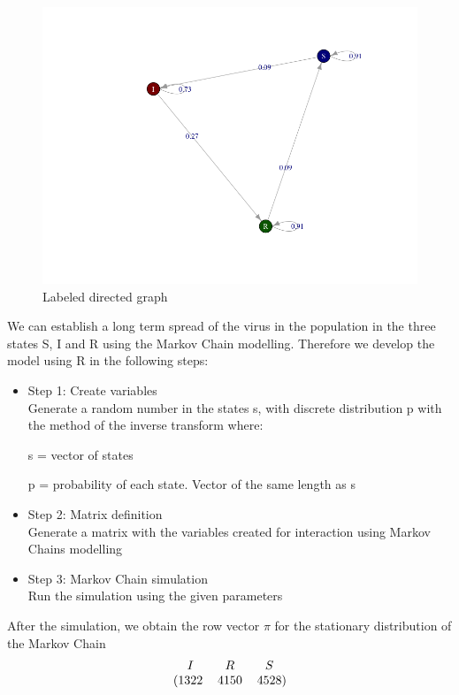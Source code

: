 \documentclass[10pt]{article}
\theoremstyle{plain}
\theoremstyle{definition}
\begin{document}
\begin{figure}[H]
    \centering
    \includegraphics[scale=0.5]{figures/MCPlot.png}
    \caption{Labeled directed graph}
    \label{fig:my_label1}
\end{figure}
We can establish a long term spread of the virus in the population in the three states S, I and R using the Markov Chain modelling. Therefore we develop the model using R in the following steps: 
\begin{itemize}
    \item Step 1: Create variables\\
    Generate a random number in the states s, with discrete distribution p with the method of the inverse transform where: 

s = vector of states 

p = probability of each state. Vector of the same length as s 

    \item Step 2: Matrix definition \\
    Generate a matrix with the variables created for interaction using Markov Chains modelling

    
    \item Step 3: Markov Chain simulation \\
    Run the simulation using the given parameters

\end{itemize}

After the simulation, we obtain the row vector $\pi$ for the stationary distribution of the Markov Chain 
\begin{equation}
\begin{blockarray}{ccc}
         I & R & S \\
      \begin{block}{(ccc)}
        1322 & 4150 & 4528\\
      \end{block}
    \end{blockarray}
\end{equation}
\end{document}
